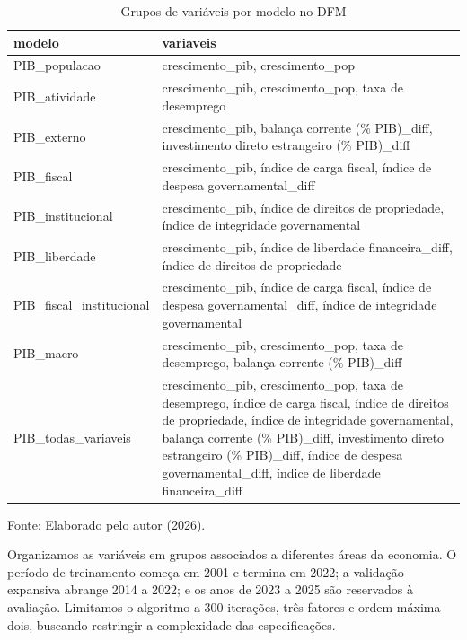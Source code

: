 \begin{table}[htbp]
	\centering
	\captionsetup{justification=centering}
	\caption{Grupos de variáveis por modelo no DFM}
	\label{tab:grupos_dfm}
	
	\scriptsize
	\setlength{\tabcolsep}{2pt}
	\renewcommand{\arraystretch}{1.3}
	
	\begin{tabularx}{\textwidth}{>{\RaggedRight\arraybackslash}X>{\RaggedRight\arraybackslash}X}
		\toprule
		modelo & variaveis \\
		\midrule
		PIB\_populacao & crescimento\_pib, crescimento\_pop \\
		PIB\_atividade & crescimento\_pib, crescimento\_pop, taxa de desemprego \\
		PIB\_externo & crescimento\_pib, balança corrente (\% PIB)\_diff, investimento direto estrangeiro (\% PIB)\_diff \\
		PIB\_fiscal & crescimento\_pib, índice de carga fiscal, índice de despesa governamental\_diff \\
		PIB\_institucional & crescimento\_pib, índice de direitos de propriedade, índice de integridade governamental \\
		PIB\_liberdade & crescimento\_pib, índice de liberdade financeira\_diff, índice de direitos de propriedade \\
		PIB\_fiscal\_institucional & crescimento\_pib, índice de carga fiscal, índice de despesa governamental\_diff, índice de integridade governamental \\
		PIB\_macro & crescimento\_pib, crescimento\_pop, taxa de desemprego, balança corrente (\% PIB)\_diff \\
		PIB\_todas\_variaveis & crescimento\_pib, crescimento\_pop, taxa de desemprego, índice de carga fiscal, índice de direitos de propriedade, índice de integridade governamental, balança corrente (\% PIB)\_diff, investimento direto estrangeiro (\% PIB)\_diff, índice de despesa governamental\_diff, índice de liberdade financeira\_diff \\
		\bottomrule
	\end{tabularx}
	
	
	\vspace{0.1cm}
	
	\small Fonte: Elaborado pelo autor (2026).
\end{table}

Organizamos as variáveis em grupos associados a diferentes áreas da economia. O período de treinamento começa em 2001 e termina em 2022; a validação expansiva abrange 2014 a 2022; e os anos de 2023 a 2025 são reservados à avaliação. Limitamos o algoritmo a 300 iterações, três fatores e ordem máxima dois, buscando restringir a complexidade das especificações.

